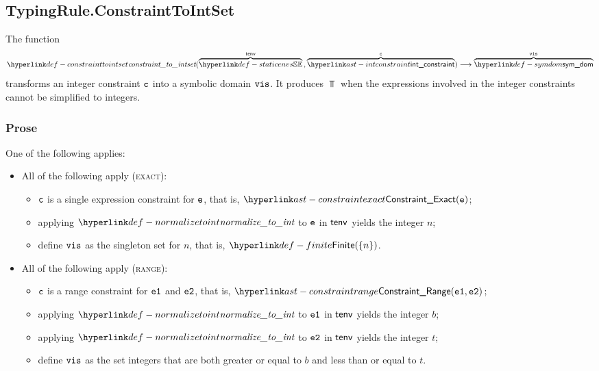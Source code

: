 \subsection{TypingRule.ConstraintToIntSet \label{sec:TypingRule.ConstraintToIntSet}}
\hypertarget{def-constrainttointset}{}
The function
\[
  \constrainttointset(
    \overname{\staticenvs}{\tenv} \aslsep
    \overname{\intconstraint}{\vc}
  ) \aslto
  \overname{\symdom}{\vis}
\]
transforms an integer constraint $\texttt{c}$ into a symbolic domain $\texttt{vis}$.
It produces $\Top$ when the expressions involved in the integer constraints cannot be simplified
to integers.

\subsubsection{Prose}
One of the following applies:
\begin{itemize}
  \item All of the following apply (\textsc{exact}):
  \begin{itemize}
    \item $\texttt{c}$ is a single expression constraint for $\texttt{e}$, that is, $\ConstraintExact(\ve)$;
    \item applying $\normalizetoint$ to $\texttt{e}$ in $\textsf{tenv}$ yields the integer $n$\ProseTerminateAs{\Top};
    \item define $\texttt{vis}$ as the singleton set for $n$, that is, $\Finite(\{n\})$.
  \end{itemize}

  \item All of the following apply (\textsc{range}):
  \begin{itemize}
    \item $\texttt{c}$ is a range constraint for $\texttt{e1}$ and $\texttt{e2}$, that is, $\ConstraintRange(\veone, \vetwo)$;
    \item applying $\normalizetoint$ to $\texttt{e1}$ in $\textsf{tenv}$ yields the integer $b$\ProseTerminateAs{\Top};
    \item applying $\normalizetoint$ to $\texttt{e2}$ in $\textsf{tenv}$ yields the integer $t$\ProseTerminateAs{\Top};
    \item define $\texttt{vis}$ as the set integers that are both greater or equal to $b$ and less than or equal to $t$.
  \end{itemize}
\end{itemize}

